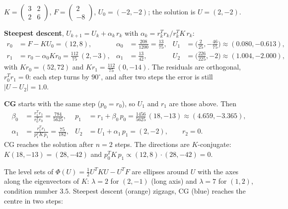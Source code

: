 




 $K = \begin{pmatrix} 3 & 2 \\ 2 & 6 \end{pmatrix}$, $F = \begin{pmatrix} 2 \\ -8 \end{pmatrix}$,
$U_0 = (-2, -2)$; the solution is $U = (2, -2)$.

\textbf{Steepest descent}, $U_{k+1} = U_k + \alpha_k\, r_k$ with $\alpha_k = r_k^T r_k / r_k^T K\, r_k$:
\[
\begin{aligned}
  r_0 &= F - K U_0 = (12, 8), & \alpha_0 &= \tfrac{208}{1200} = \tfrac{13}{75}, &
  U_1 &= \big(\tfrac{2}{25}, -\tfrac{46}{75}\big) \approx (0.080, -0.613), \\
  r_1 &= r_0 - \alpha_0 K r_0 = \tfrac{112}{75}\, (2, -3), & \alpha_1 &= \tfrac{13}{42}, &
  U_2 &= \big(\tfrac{226}{225}, -2\big) \approx (1.004, -2.000),
\end{aligned}
\]
with $K r_0 = (52, 72)$ and $K r_1 = \tfrac{112}{75}\, (0, -14)$.
The residuals are orthogonal, $r_0^T r_1 = 0$: each step turns by $90^\circ$, and after two steps the error is still
$|U - U_2| = 1.0$.

\textbf{CG} starts with the same step ($p_0 = r_0$), so $U_1$ and $r_1$ are those above. Then
\[
\begin{aligned}
  \beta_0 &= \frac{r_1^T r_1}{r_0^T r_0} = \frac{784}{5625}, &
  p_1 &= r_1 + \beta_0\, p_0 = \tfrac{1456}{5625}\, (18, -13) \approx (4.659, -3.365), \\
  \alpha_1 &= \frac{r_1^T r_1}{p_1^T K\, p_1} = \frac{75}{182}, &
  U_2 &= U_1 + \alpha_1\, p_1 = (2, -2), \qquad r_2 = 0 .
\end{aligned}
\]
CG reaches the solution after $n = 2$ steps. The directions are $K$-conjugate: $K (18, -13) = (28, -42)$ and
$p_0^T K\, p_1 \propto (12, 8) \cdot (28, -42) = 0$.

The level sets of $\Phi(U) = \tfrac12 U^T K U - U^T F$ are ellipses around $U$ with the axes along the eigenvectors of
$K$: $\lambda = 2$ for $(2, -1)$ (long axis) and $\lambda = 7$ for $(1, 2)$, condition number $3.5$. Steepest descent
(orange) zigzags, CG (blue) reaches the centre in two steps:

